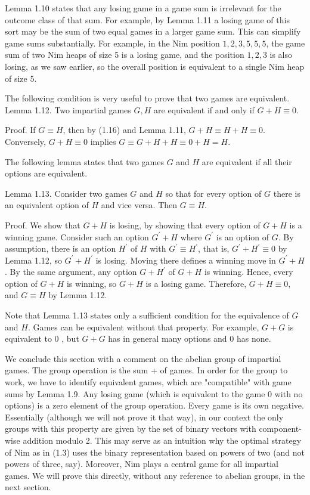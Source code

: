 \documentclass[12pt]{article}
\begin{document}
Lemma 1.10 states that any losing game in a game sum is irrelevant for the outcome class of that sum. For example, by Lemma 1.11 a losing game of this sort may be the sum of two equal games in a larger game sum. This can simplify game sums substantially. For example, in the Nim position $1,2,3,5,5,5$, the game sum of two Nim heaps of size 5 is a losing game, and the position $1,2,3$ is also losing, as we saw earlier, so the overall position is equivalent to a single Nim heap of size 5.

The following condition is very useful to prove that two games are equivalent.\\
Lemma 1.12. Two impartial games $G, H$ are equivalent if and only if $G+H \equiv 0$.

Proof. If $G \equiv H$, then by (1.16) and Lemma 1.11, $G+H \equiv H+H \equiv 0$. Conversely, $G+H \equiv 0$ implies $G \equiv G+H+H \equiv 0+H=H$.

The following lemma states that two games $G$ and $H$ are equivalent if all their options are equivalent.

Lemma 1.13. Consider two games $G$ and $H$ so that for every option of $G$ there is an equivalent option of $H$ and vice versa. Then $G \equiv H$.

Proof. We show that $G+H$ is losing, by showing that every option of $G+H$ is a winning game. Consider such an option $G^{\prime}+H$ where $G^{\prime}$ is an option of $G$. By assumption, there is an option $H^{\prime}$ of $H$ with $G^{\prime} \equiv H^{\prime}$, that is, $G^{\prime}+H^{\prime} \equiv 0$ by Lemma 1.12, so $G^{\prime}+H^{\prime}$ is losing. Moving there defines a winning move in $G^{\prime}+H$. By the same argument, any option $G+H^{\prime}$ of $G+H$ is winning. Hence, every option of $G+H$ is winning, so $G+H$ is a losing game. Therefore, $G+H \equiv 0$, and $G \equiv H$ by Lemma 1.12.

Note that Lemma 1.13 states only a sufficient condition for the equivalence of $G$ and $H$. Games can be equivalent without that property. For example, $G+G$ is equivalent to 0 , but $G+G$ has in general many options and 0 has none.

We conclude this section with a comment on the abelian group of impartial games. The group operation is the sum + of games. In order for the group to work, we have to identify equivalent games, which are "compatible" with game sums by Lemma 1.9. Any losing game (which is equivalent to the game 0 with no options) is a zero element of the group operation. Every game is its own negative. Essentially (although we will not prove it that way), in our context the only groups with this property are given by the set of binary vectors with component-wise addition modulo 2. This may serve as an intuition why the optimal strategy of Nim as in (1.3) uses the binary representation based on powers of two (and not powers of three, say). Moreover, Nim plays a central game for all impartial games. We will prove this directly, without any reference to abelian groups, in the next section.
\end{document}
